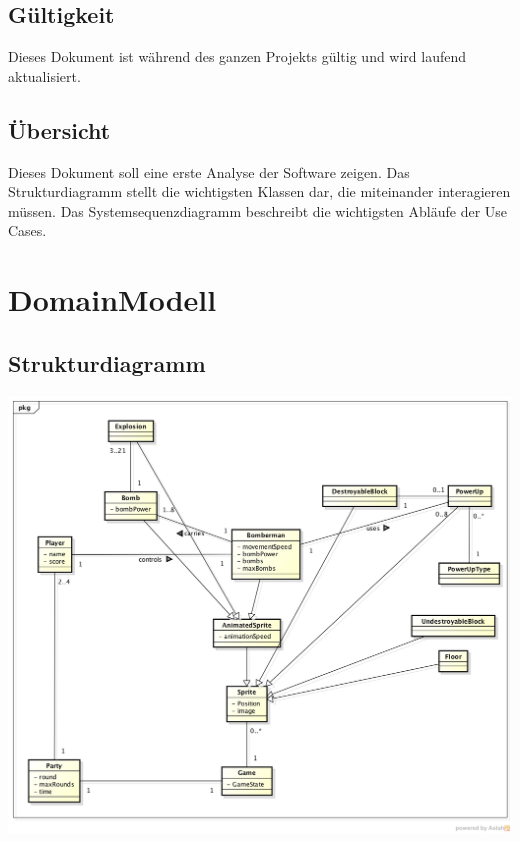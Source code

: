\documentclass[11pt]{scrartcl}
\begin{document}
\subsection{Gültigkeit}
\label{sec:Gültigkeit}
Dieses Dokument ist während des ganzen Projekts gültig und wird laufend aktualisiert.

\subsection{Übersicht}
\label{sec:Übersicht}
Dieses Dokument soll eine erste Analyse der Software zeigen. Das Strukturdiagramm stellt die wichtigsten Klassen dar, die miteinander interagieren müssen. Das Systemsequenzdiagramm beschreibt die wichtigsten Abläufe der Use Cases.

\newpage
\section{DomainModell}
\label{sec:DomainModell}
\subsection{Strukturdiagramm}
\label{sec:Strukturdiagramm}

\begin{center}
\includegraphics[scale=0.5]{Strukturdiagramm_JBomberman} 
\end{center}

\newpage
\end{document}
